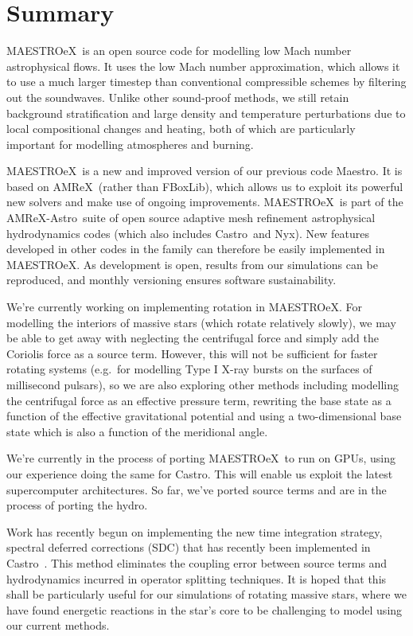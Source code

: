 \documentclass[a4paper]{jpconf}
\newcommand{\maestro}{{\sffamily Maestro}}
\newcommand{\maestroex}{{\sffamily MAESTROeX}}
\newcommand{\castro}{{\sffamily Castro}}
\newcommand{\nyx}{{\sffamily Nyx}}
\newcommand{\amrex}{{\sffamily AMReX}}
\newcommand{\amrexastro}{{\sffamily AMReX-Astro}}
\newcommand{\fboxlib}{{\sffamily FBoxLib}}
\begin{document}

\section{Summary} \label{sec:summary}

\maestroex~is an open source code for modelling low Mach number astrophysical flows. It uses the low Mach number approximation, which allows it to use a much larger timestep than conventional compressible schemes by filtering out the soundwaves. Unlike other sound-proof methods, we still retain background stratification and large density and temperature perturbations due to local compositional changes and heating, both of which are particularly important for modelling atmospheres and burning. 

\maestroex~is a new and improved version of our previous code \maestro. It is based on \amrex~(rather than \fboxlib), which allows us to exploit its powerful new solvers and make use of ongoing improvements. \maestroex~is part of the \amrexastro~suite of open source adaptive mesh refinement astrophysical hydrodynamics codes (which also includes \castro~and \nyx). New features developed in other codes in the family can therefore be easily implemented in \maestroex. As development is open, results from our simulations can be reproduced, and monthly versioning ensures software sustainability.

We're currently working on implementing rotation in \maestroex. For modelling the interiors of massive stars (which rotate relatively slowly), we may be able to get away with neglecting the centrifugal force and simply add the Coriolis force as a source term. However, this will not be sufficient for faster rotating systems (e.g.~for modelling Type I X-ray bursts on the surfaces of millisecond pulsars), so we are also exploring other methods including modelling the centrifugal force as an effective pressure term, rewriting the base state as a function of the effective gravitational potential and using a two-dimensional base state which is also a function of the meridional angle.

We're currently in the process of porting \maestroex~to run on GPUs, using our experience doing the same for \castro. This will enable us exploit the latest supercomputer architectures. So far, we've ported source terms and are in the process of porting the hydro. 

Work has recently begun on implementing the new time integration strategy, spectral deferred corrections (SDC) that has recently been implemented in \castro~\cite{castro:sdc}. This method eliminates the coupling error between source terms and hydrodynamics incurred in operator splitting techniques. It is hoped that this shall be particularly useful for our simulations of rotating massive stars, where we have found energetic reactions in the star's core to be challenging to model using our current methods. 
\end{document}
